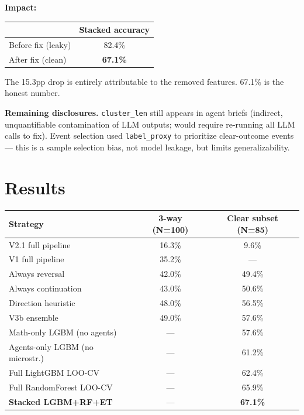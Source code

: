 \documentclass[11pt, a4paper]{article}
\begin{document}
\textbf{Impact:}

\begin{center}
\begin{tabular}{lc}
\toprule
& \textbf{Stacked accuracy} \\
\midrule
Before fix (leaky) & 82.4\% \\
After fix (clean)  & \textbf{67.1\%} \\
\bottomrule
\end{tabular}
\end{center}

The 15.3pp drop is entirely attributable to the removed features. 67.1\% is the honest number.

\textbf{Remaining disclosures.} \texttt{cluster\_len} still appears in agent briefs (indirect, unquantifiable contamination of LLM outputs; would require re-running all LLM calls to fix). Event selection used \texttt{label\_proxy} to prioritize clear-outcome events — this is a sample selection bias, not model leakage, but limits generalizability.

\section{Results}

\begin{center}
\renewcommand{\arraystretch}{1.25}
\begin{tabular}{lcc}
\toprule
\textbf{Strategy} & \textbf{3-way (N=100)} & \textbf{Clear subset (N=85)} \\
\midrule
V2.1 full pipeline              & 16.3\% & 9.6\% \\
V1 full pipeline                & 35.2\% & — \\
Always reversal                 & 42.0\% & 49.4\% \\
Always continuation             & 43.0\% & 50.6\% \\
Direction heuristic             & 48.0\% & 56.5\% \\
V3b ensemble                    & 49.0\% & 57.6\% \\
\midrule
Math-only LGBM (no agents)      & — & 57.6\% \\
Agents-only LGBM (no microstr.) & — & 61.2\% \\
Full LightGBM LOO-CV            & — & 62.4\% \\
Full RandomForest LOO-CV        & — & 65.9\% \\
\textbf{Stacked LGBM+RF+ET}     & — & \textbf{67.1\%} \\
\bottomrule
\end{tabular}
\end{center}
\end{document}
